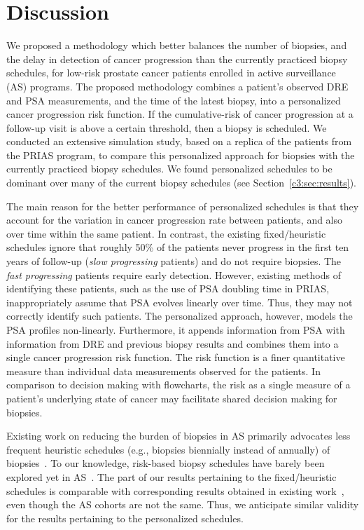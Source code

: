 \section{Discussion}
\label{c3:sec:discussion}
We proposed a methodology which better balances the number of biopsies, and the delay in detection of cancer progression than the currently practiced biopsy schedules, for low-risk prostate cancer patients enrolled in active surveillance (AS) programs. The proposed methodology combines a patient's observed DRE and PSA measurements, and the time of the latest biopsy, into a personalized cancer progression risk function. If the cumulative-risk of cancer progression at a follow-up visit is above a certain threshold, then a biopsy is scheduled. We conducted an extensive simulation study, based on a replica of the patients from the PRIAS program, to compare this personalized approach for biopsies with the currently practiced biopsy schedules. We found personalized schedules to be dominant over many of the current biopsy schedules (see Section~\ref{c3:sec:results}).

The main reason for the better performance of personalized schedules is that they account for the variation in cancer progression rate between patients, and also over time within the same patient. In contrast, the existing fixed/heuristic schedules ignore that roughly 50\% of the patients never progress in the first ten years of follow-up (\emph{slow progressing} patients) and do not require biopsies. The \emph{fast progressing} patients require early detection. However, existing methods of identifying these patients, such as the use of PSA doubling time in PRIAS, inappropriately assume that PSA evolves linearly over time. Thus, they may not correctly identify such patients. The personalized approach, however, models the PSA profiles non-linearly. Furthermore, it appends information from PSA with information from DRE and previous biopsy results and combines them into a single cancer progression risk function. The risk function is a finer quantitative measure than individual data measurements observed for the patients. In comparison to decision making with flowcharts, the risk as a single measure of a patient's underlying state of cancer may facilitate shared decision making for biopsies.

Existing work on reducing the burden of biopsies in AS primarily advocates less frequent heuristic schedules (e.g., biopsies biennially instead of annually) of biopsies~\citep{inoue2018comparative}. To our knowledge, risk-based biopsy schedules have barely been explored yet in AS~\citep{nieboer2018active,bruinsma2016active}. The part of our results pertaining to the fixed/heuristic schedules is comparable with corresponding results obtained in existing work~\citep{inoue2018comparative}, even though the AS cohorts are not the same. Thus, we anticipate similar validity for the results pertaining to the personalized schedules.


